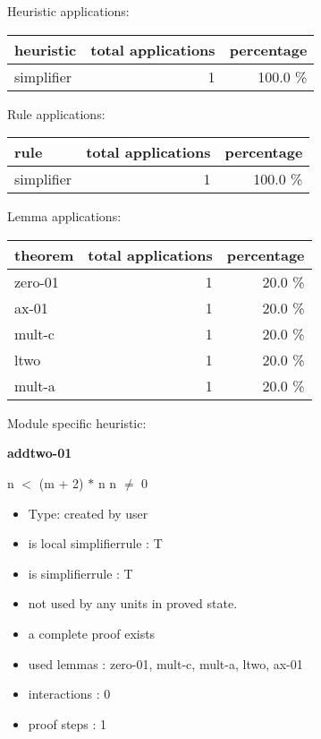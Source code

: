 \documentclass[a4paper]{article}
\begin{document}
\medskip


Heuristic applications:

\begin{supertabular}{l|r|r}
heuristic	& total applications & percentage \\ \hline
simplifier & 1 & 100.0 \% \\

\end{supertabular}

Rule applications:

\begin{supertabular}{l|r|r}
rule	        & total applications & percentage \\ \hline
simplifier & 1 & 100.0 \% \\

\end{supertabular}

Lemma applications:

\begin{supertabular}{l|r|r}
theorem	        & total applications & percentage \\ \hline
zero-01 & 1 & 20.0 \% \\
ax-01 & 1 & 20.0 \% \\
mult-c & 1 & 20.0 \% \\
ltwo & 1 & 20.0 \% \\
mult-a & 1 & 20.0 \% \\

\end{supertabular}

Module specific heuristic:

\pagebreak

{\LARGE\bf addtwo-01}\label{lemma-addtwo-01}

\medskip

 \Fol n $<$ (m + 2) $*$ n \Equiv n $\neq$ 0

\begin{itemize}

\item Type: created by user

\item is local simplifierrule : T
\item is simplifierrule : T
\item not used by any units in proved state.
\item       a complete proof exists
\item       used lemmas  : zero-01, mult-c, mult-a, ltwo, ax-01
\item       interactions : 0
\item       proof steps  : 1
\end{itemize}
\end{document}
